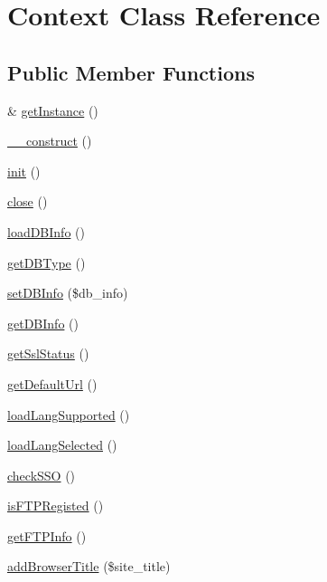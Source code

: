 \hypertarget{classContext}{\section{Context Class Reference}
\label{classContext}
}
\subsection*{Public Member Functions}
\begin{DoxyCompactItemize}
\item 
\& \hyperlink{classContext_a399e419617c7fe9b0c9eaf22c431df69}{get\-Instance} ()
\item 
\hyperlink{classContext_acaa962b90a7ee3be3c7c5ae8b3303ba0}{\-\_\-\-\_\-construct} ()
\item 
\hyperlink{classContext_a346f3609536006fd2d90b4b9b857ff67}{init} ()
\item 
\hyperlink{classContext_ad59031e45d21ad27eb7d06e0ee76f008}{close} ()
\item 
\hyperlink{classContext_af9a710b382c01e18ddabc728d04f5667}{load\-D\-B\-Info} ()
\item 
\hyperlink{classContext_a2e90e7083bcc220daeec3d4d8d3bb427}{get\-D\-B\-Type} ()
\item 
\hyperlink{classContext_a38118f103a5c23c7ef7634886b030770}{set\-D\-B\-Info} (\$db\-\_\-info)
\item 
\hyperlink{classContext_a54dd61c7b035a12697db8ca3f1c6849c}{get\-D\-B\-Info} ()
\item 
\hyperlink{classContext_a284a60296c1f3df3adbe3395769fa883}{get\-Ssl\-Status} ()
\item 
\hyperlink{classContext_abf99203a93b0b0de0da3fbeced6ce333}{get\-Default\-Url} ()
\item 
\hyperlink{classContext_aec949117f584972aa60416e60f460c8b}{load\-Lang\-Supported} ()
\item 
\hyperlink{classContext_afe4b34f1e0286152e17981fd1da3a560}{load\-Lang\-Selected} ()
\item 
\hyperlink{classContext_a364d9a1075ce5ee44c0c73d91420aaca}{check\-S\-S\-O} ()
\item 
\hyperlink{classContext_aee42b43176df53b80d5bbf8f6ce14459}{is\-F\-T\-P\-Registed} ()
\item 
\hyperlink{classContext_a4f3473f93028ce5f422135106f125f31}{get\-F\-T\-P\-Info} ()
\item 
\hyperlink{classContext_ac08df39b79aca5d52cc5d45adba5d3a6}{add\-Browser\-Title} (\$site\-\_\-title)
\item 

\end{DoxyCompactItemize}
